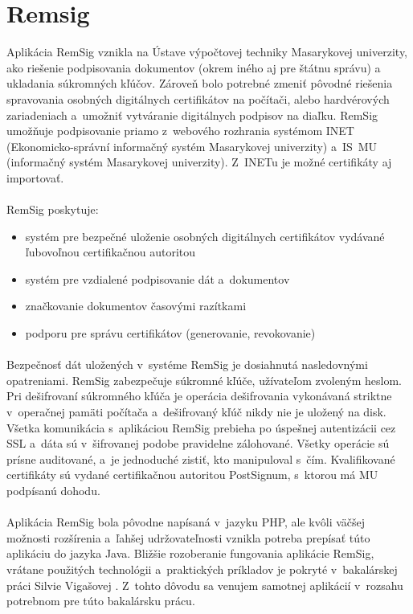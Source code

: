 \documentclass[
  digital, %
  table,   %
oneside,
  nolof,     %
  nolot,     %
]{fithesis3}
\begin{document}
\section{Remsig}
Aplikácia RemSig \cite{remsigMuni} vznikla na Ústave výpočtovej techniky Masarykovej univerzity, ako riešenie podpisovania dokumentov (okrem iného aj pre štátnu správu) a ukladania súkromných kľúčov. Zároveň bolo potrebné zmeniť pôvodné riešenia spravovania osobných digitálnych certifikátov na počítači, alebo hardvérových zariadeniach a~umožniť vytváranie digitálnych podpisov na diaľku. RemSig umožňuje podpisovanie priamo z~webového rozhrania systémom INET (Ekonomicko-správní informačný systém Masarykovej univerzity) a~IS~MU (informačný systém Masarykovej univerzity). Z~INETu je možné certifikáty aj importovať.\paragraph{}
RemSig poskytuje:
\begin{itemize}
\item systém pre bezpečné uloženie osobných digitálnych certifikátov vydávané ľubovoľnou certifikačnou autoritou
\item systém pre vzdialené podpisovanie dát a~dokumentov
\item značkovanie dokumentov časovými razítkami 
\item podporu pre správu certifikátov (generovanie, revokovanie)

 \end{itemize}

\paragraph{}
Bezpečnosť dát uložených v~systéme RemSig je dosiahnutá nasledovnými opatreniami. RemSig zabezpečuje súkromné kľúče, užívateľom zvoleným heslom. Pri dešifrovaní súkromného kľúča je operácia dešifrovania vykonávaná striktne v~operačnej pamäti počítača a~dešifrovaný kľúč nikdy nie je uložený na disk. Všetka komunikácia s~aplikáciou RemSig prebieha po úspešnej autentizácii cez SSL a~dáta sú v~šifrovanej podobe pravidelne zálohované. Všetky operácie sú prísne auditované, a~je jednoduché zistiť, kto manipuloval s~čím. Kvalifikované certifikáty sú vydané certifikačnou autoritou PostSignum, s~ktorou má MU podpísanú dohodu.
\paragraph{}
Aplikácia RemSig bola pôvodne napísaná v~jazyku PHP, ale kvôli väčšej možnosti rozšírenia a~ľahšej udržovateľnosti \cite{javaVsPHP} vznikla potreba prepísať túto aplikáciu do jazyka Java.  Bližšie rozoberanie fungovania aplikácie RemSig, vrátane použitých technológii a~praktických príkladov je pokryté v~bakalárskej práci Silvie Vigašovej \cite{remsigSilvia}. Z~tohto dôvodu sa venujem samotnej aplikácií  v~rozsahu potrebnom pre túto bakalársku prácu. 
\end{document}
